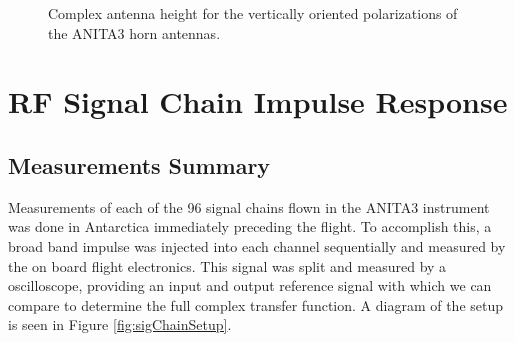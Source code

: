 \begin{figure}
\centering
{}
	\caption{Complex antenna height for the vertically oriented polarizations of the ANITA3 horn antennas.}
\label{fig:antResponse_fftV}
\end{figure}


\section{RF Signal Chain Impulse Response}
		
	\subsection{Measurements Summary}
		Measurements of each of the 96 signal chains flown in the ANITA3 instrument was done in Antarctica immediately preceding the flight.  To accomplish this, a broad band impulse was injected into each channel sequentially and measured by the on board flight electronics.  This signal was split and measured by a oscilloscope, providing an input and output reference signal with which we can compare to determine the full complex transfer function.  A diagram of the setup is seen in Figure \ref{fig:sigChainSetup}.


